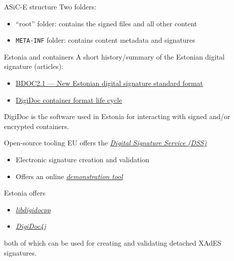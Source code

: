 \begin{frame}{ASiC-E structure}
  Two folders:
  \begin{itemize}[<+(1)->]
    \item \enquote{root} folder: contains the signed files and all other content
    \item \texttt{META-INF} folder: contains content metadata and signatures
  \end{itemize}
\end{frame}

\begin{frame}{Estonia and containers}
  A short history/summary of the Estonian digital signature (articles):
  \begin{itemize}
    \item \href{https://www.id.ee/en/article/bdoc2-1-new-estonian-digital-signature-standard-format/}{BDOC2.1 --- New Estonian digital signature standard format}
    \item \href{https://www.id.ee/en/article/digidoc-container-format-life-cycle-2/}{DigiDoc container format life cycle}
  \end{itemize}

  \vspace*{1em}

  \pause
  DigiDoc is the software used in Estonia for interacting with signed and/or encrypted containers.
\end{frame}

\begin{frame}{Open-source tooling}
  EU offers the \href{https://ec.europa.eu/digital-building-blocks/sites/spaces/DIGITAL/pages/467109107/Digital+Signature+Service+-+DSS}{\textit{Digital Signature Service (DSS)}}
  \begin{itemize}
    \item Electronic signature creation and validation
    \item Offers an online \href{https://ec.europa.eu/digital-building-blocks/DSS/webapp-demo/}{\textit{demonstration tool}}
  \end{itemize}

  \vspace*{1em}

  \pause
  Estonia offers
  \begin{itemize}
    \item \href{https://github.com/open-eid/libdigidocpp}{\textit{libdigidocpp}}
    \item \href{https://github.com/open-eid/digidoc4j}{\textit{DigiDoc4j}}
  \end{itemize}
  both of which can be used for creating and validating detached XAdES signatures.
\end{frame}


